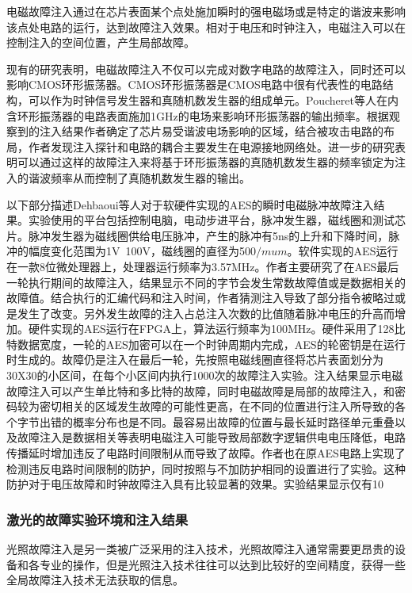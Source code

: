 \documentclass[a4paper,12pt]{article}
\begin{document}
\begin{CJK}{UTF8}{gkai}
电磁故障注入通过在芯片表面某个点处施加瞬时的强电磁场或是特定的谐波来影响该点处电路的运行，达到故障注入效果。相对于电压和时钟注入，电磁注入可以在控制注入的空间位置，产生局部故障。

现有的研究表明，电磁故障注入不仅可以完成对数字电路的故障注入，同时还可以影响CMOS环形振荡器。CMOS环形振荡器是CMOS电路中很有代表性的电路结构，可以作为时钟信号发生器和真随机数发生器的组成单元。Poucheret等人在内含环形振荡器的电路表面施加1GHz的电场来影响环形振荡器的输出频率。根据观察到的注入结果作者确定了芯片易受谐波电场影响的区域，结合被攻击电路的布局，作者发现注入探针和电路的耦合主要发生在电源接地网络处。进一步的研究表明可以通过这样的故障注入来将基于环形振荡器的真随机数发生器的频率锁定为注入的谐波频率从而控制了真随机数发生器的输出。

以下部分描述Dehbaoui等人对于软硬件实现的AES的瞬时电磁脉冲故障注入结果。实验使用的平台包括控制电脑，电动步进平台，脉冲发生器，磁线圈和测试芯片。脉冲发生器为磁线圈供给电压脉冲，产生的脉冲有5ns的上升和下降时间，脉冲的幅度变化范围为1V~100V，磁线圈的直径为500$/mu m$。软件实现的AES运行在一款8位微处理器上，处理器运行频率为3.57MHz。作者主要研究了在AES最后一轮执行期间的故障注入，结果显示不同的字节会发生常数故障值或是数据相关的故障值。结合执行的汇编代码和注入时间，作者猜测注入导致了部分指令被略过或是发生了改变。另外发生故障的注入占总注入次数的比值随着脉冲电压的升高而增加。硬件实现的AES运行在FPGA上，算法运行频率为100MHz。硬件采用了128比特数据宽度，一轮的AES加密可以在一个时钟周期内完成，AES的轮密钥是在运行时生成的。故障仍是注入在最后一轮，先按照电磁线圈直径将芯片表面划分为30X30的小区间，在每个小区间内执行1000次的故障注入实验。注入结果显示电磁故障注入可以产生单比特和多比特的故障，同时电磁故障是局部的故障注入，和密码较为密切相关的区域发生故障的可能性更高，在不同的位置进行注入所导致的各个字节出错的概率分布也是不同。最容易出故障的位置与最长延时路径单元重叠以及故障注入是数据相关等表明电磁注入可能导致局部数字逻辑供电电压降低，电路传播延时增加违反了电路时间限制从而导致了故障。作者也在原AES电路上实现了检测违反电路时间限制的防护，同时按照与不加防护相同的设置进行了实验。这种防护对于电压故障和时钟故障注入具有比较显著的效果。实验结果显示仅有10%

\subsubsection{激光的故障实验环境和注入结果}

光照故障注入是另一类被广泛采用的注入技术，光照故障注入通常需要更昂贵的设备和各专业的操作，但是光照注入技术往往可以达到比较好的空间精度，获得一些全局故障注入技术无法获取的信息。
 

\end{CJK}
\end{document}
